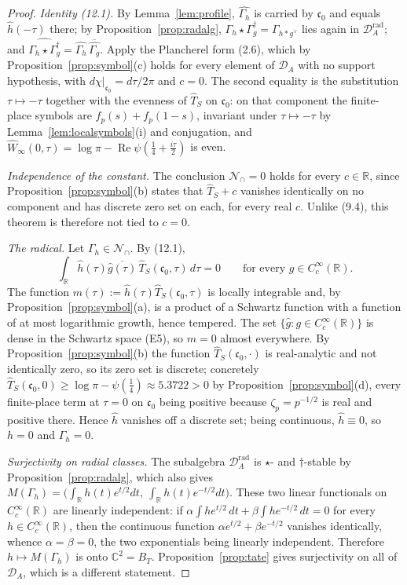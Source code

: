 \documentclass[11pt]{amsart}
\theoremstyle{definition}
\theoremstyle{remark}
\newcommand{\C}{\mathbb C}
\newcommand{\R}{\mathbb R}
\newcommand{\Rel}{\operatorname{Re}}
\newcommand{\DA}{\mathcal D_A}
\newcommand{\DAr}{\mathcal D_A^{\mathrm{rad}}}
\newcommand{\cz}{\mathfrak c_0}
\newcommand{\BT}{B_T}
\begin{document}
\begin{proof}
\emph{Identity \emph{(12.1)}.}  By Lemma~\ref{lem:profile}, $\widehat{\Gamma_h}$
is carried by $\cz$ and equals $\hat h(-\tau)$ there; by
Proposition~\ref{prop:radalg}, $\Gamma_h\star\Gamma_g^\dagger=\Gamma_{h*g^\vee}$
lies again in $\DAr$; and $\widehat{\Gamma_h\star\Gamma_g^\dagger}
=\widehat{\Gamma_h}\,\overline{\widehat{\Gamma_g}}$.  Apply the Plancherel form
(2.6), which by Proposition~\ref{prop:symbol}(c) holds for every element of
$\DA$ with no support hypothesis, with $d\chi|_{\cz}=d\tau/2\pi$ and $c=0$.
The second equality is the substitution $\tau\mapsto-\tau$ together with the
evenness of $\widehat T_S$ on $\cz$: on that component the finite-place symbols
are $f_p(s)+f_p(1-s)$, invariant under $\tau\mapsto-\tau$ by
Lemma~\ref{lem:localsymbols}(i) and conjugation, and
$\widehat W_\infty(0,\tau)=\log\pi-\Rel\psi(\tfrac14+\tfrac{i\tau}2)$ is even.

\emph{Independence of the constant.}  The conclusion $\mathcal N_\cap=0$ holds
for every $c\in\R$, since Proposition~\ref{prop:symbol}(b) states that
$\widehat T_S+c$ vanishes identically on no component and has discrete zero set
on each, for every real $c$.  Unlike (9.4), this theorem is therefore not tied
to $c=0$.

\emph{The radical.}  Let $\Gamma_h\in\mathcal N_\cap$.  By (12.1),
\[
  \int_\R\hat h(\tau)\overline{\hat g(\tau)}\,\widehat T_S(\cz,\tau)\,d\tau=0
  \qquad\text{for every }g\in C_c^\infty(\R).
\]
The function $m(\tau):=\hat h(\tau)\widehat T_S(\cz,\tau)$ is locally
integrable and, by Proposition~\ref{prop:symbol}(a), is a product of a Schwartz
function with a function of at most logarithmic growth, hence tempered.  The
set $\{\hat g: g\in C_c^\infty(\R)\}$ is dense in the Schwartz space (E5), so
$m=0$ almost everywhere.  By Proposition~\ref{prop:symbol}(b) the function
$\widehat T_S(\cz,\cdot)$ is real-analytic and not identically zero, so its
zero set is discrete; concretely
$\widehat T_S(\cz,0)\ge\log\pi-\psi(\tfrac14)\approx5.3722>0$ by
Proposition~\ref{prop:symbol}(d), every finite-place term at $\tau=0$ on $\cz$
being positive because $\zeta_p=p^{-1/2}$ is real and positive there.  Hence
$\hat h$ vanishes off a discrete set; being continuous, $\hat h\equiv0$, so
$h=0$ and $\Gamma_h=0$.

\emph{Surjectivity on radial classes.}  The subalgebra $\DAr$ is $\star$- and
$\dagger$-stable by Proposition~\ref{prop:radalg}, which also gives
$M(\Gamma_h)=\bigl(\int_\R h(t)e^{t/2}dt,\ \int_\R h(t)e^{-t/2}dt\bigr)$.
These two linear functionals on $C_c^\infty(\R)$ are linearly independent: if
$\alpha\int he^{t/2}\,dt+\beta\int he^{-t/2}\,dt=0$ for every
$h\in C_c^\infty(\R)$, then the continuous function
$\alpha e^{t/2}+\beta e^{-t/2}$ vanishes identically, whence $\alpha=\beta=0$,
the two exponentials being linearly independent.  Therefore
$h\mapsto M(\Gamma_h)$ is onto $\C^2=\BT$.  Proposition~\ref{prop:tate} gives
surjectivity on all of $\DA$, which is a different statement.
\end{proof}
\end{document}
